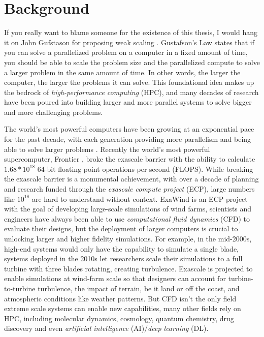 
\glsresetall %
\chapter[Background]{Background}\label{ch:Background}

If you really want to blame someone for the existence of this thesis, I would hang it on John Gufstason for proposing weak scaling \cite{Gustafson1988GustafsonLaw}.
Gustafson's Law states that if you can solve a parallelized problem on a computer in a fixed amount of time, you should be able to scale the problem size and the parallelized compute to solve a larger problem in the same amount of time.
In other words, the larger the computer, the larger the problems it can solve.
This foundational idea makes up the bedrock of \textit{high-performance computing} (HPC), and many decades of research have been poured into building larger and more parallel systems to solve bigger and more challenging problems.

The world's most powerful computers have been growing at an exponential pace for the past decade, with each generation providing more parallelism and being able to solve larger problems \cite{Top500}.
Recently the world's most powerful supercomputer, Frontier \cite{Frontier}, broke the exascale barrier with the ability to calculate $1.68*10^{18}$ 64-bit floating point operations per second (FLOPS). 
While breaking the exascale barrier is a monumental achievement, with over a decade of planning and research funded through the \textit{exascale compute project} (ECP), large numbers like $10^{18}$ are hard to understand without context.
ExaWind \cite{ExaWind} is an ECP project with the goal of developing large-scale simulations of wind farms, scientists and engineers have always been able to use \textit{computational fluid dynamics} (CFD) to evaluate their designs, but the deployment of larger computers is crucial to unlocking larger and higher fidelity simulations.
For example, in the mid-2000s, high-end systems would only have the capability to simulate a single blade, systems deployed in the 2010s let researchers scale their simulations to a full turbine with three blades rotating, creating turbulence.
Exascale is projected to enable simulations at wind-farm scale so that designers can account for turbine-to-turbine turbulence, the impact of terrain, be it land or off the coast, and atmospheric conditions like weather patterns.
But CFD isn't the only field extreme scale systems can enable new capabilities, many other fields rely on HPC, including molecular dynamics, cosmology, quantum chemistry, drug discovery and even \textit{artificial intelligence} (AI)/\textit{deep learning} (DL). 

